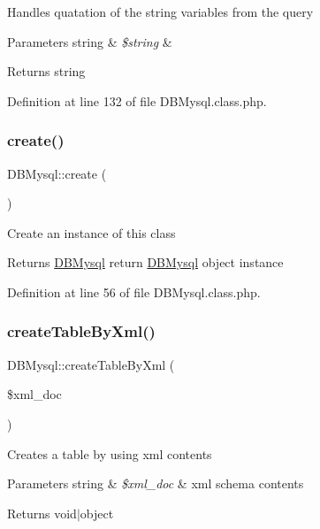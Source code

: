Handles quatation of the string variables from the query 
\begin{DoxyParams}[1]{Parameters}
string & {\em \$string} & \\
\hline
\end{DoxyParams}
\begin{DoxyReturn}{Returns}
string 
\end{DoxyReturn}


Definition at line 132 of file D\+B\+Mysql.\+class.\+php.

\mbox{\label{classDBMysql_a58ab5c56561966d486ba54129aed954d}} 
\subsubsection{\texorpdfstring{create()}{create()}}
{\footnotesize\ttfamily D\+B\+Mysql\+::create (\begin{DoxyParamCaption}{ }\end{DoxyParamCaption})}

Create an instance of this class \begin{DoxyReturn}{Returns}
\hyperlink{classDBMysql}{D\+B\+Mysql} return \hyperlink{classDBMysql}{D\+B\+Mysql} object instance 
\end{DoxyReturn}


Definition at line 56 of file D\+B\+Mysql.\+class.\+php.

\mbox{\label{classDBMysql_a8d5c199f2a7362b92c7a6ba03ebdd554}} 
\subsubsection{\texorpdfstring{create\+Table\+By\+Xml()}{createTableByXml()}}
{\footnotesize\ttfamily D\+B\+Mysql\+::create\+Table\+By\+Xml (\begin{DoxyParamCaption}\item[{}]{\$xml\+\_\+doc }\end{DoxyParamCaption})}

Creates a table by using xml contents 
\begin{DoxyParams}[1]{Parameters}
string & {\em \$xml\+\_\+doc} & xml schema contents \\
\hline
\end{DoxyParams}
\begin{DoxyReturn}{Returns}
void$\vert$object 
\end{DoxyReturn}


